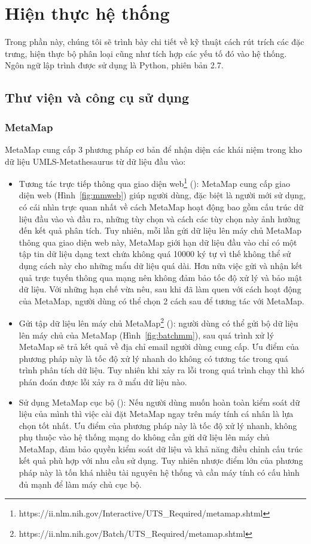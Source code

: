 \section{Hiện thực hệ thống} \label{sec:hienthuchethong}
Trong phần này, chúng tôi sẽ trình bày chi tiết về kỹ thuật cách rút trích các đặc trưng, hiện thực bộ phân loại cũng như tích hợp các yếu tố đó vào hệ thống. Ngôn ngữ lập trình được sử dụng là Python, phiên bản 2.7.

\subsection{Thư viện và công cụ sử dụng}
\subsubsection*{MetaMap}
MetaMap cung cấp 3 phương pháp cơ bản để nhận diện các khái niệm trong kho dữ liệu UMLS-Metathesaurus từ dữ liệu đầu vào:
\begin{itemize}
\item Tương tác trực tiếp thông qua giao diện web\footnote{https://ii.nlm.nih.gov/Interactive/UTS\_Required/metamap.shtml} (): MetaMap cung cấp giao diện web (Hình~\ref{fig:mmweb}) giúp người dùng, đặc biệt là người mới sử dụng, có cái nhìn trực quan nhất về cách MetaMap hoạt động bao gồm cấu trúc dữ liệu đầu vào và đầu ra, những tùy chọn và cách các tùy chọn này ảnh hưởng đến kết quả phân tích. Tuy nhiên, mỗi lần gửi dữ liệu lên máy chủ MetaMap thông qua giao diện web này, MetaMap giới hạn dữ liệu đầu vào chỉ có một tập tin dữ liệu dạng text chứa không quá 10000 ký tự vì thế không thể sử dụng cách này cho những mẩu dữ liệu quá dài. Hơn nữa việc gửi và nhận kết quả trực tuyến thông qua mạng nên không đảm bảo tốc độ xử lý và bảo mật dữ liệu. Với những hạn chế vừa nêu, sau khi đã làm quen với cách hoạt động của MetaMap, người dùng có thể chọn 2 cách sau để tương tác với MetaMap.
\item Gửi tập dữ liệu lên máy chủ MetaMap\footnote{https://ii.nlm.nih.gov/Batch/UTS\_Required/metamap.shtml} (): người dùng có thể gửi bộ dữ liệu lên máy chủ của MetaMap (Hình~\ref{fig:batchmm}), sau quá trình xử lý MetaMap sẽ trả kết quả về địa chỉ email người dùng cung cấp. Ưu điểm của phương pháp này là tốc độ xử lý nhanh do không có tương tác trong quá trình phân tích dữ liệu. Tuy nhiên khi xảy ra lỗi trong quá trình chạy thì khó phán đoán được lỗi xảy ra ở mẩu dữ liệu nào. 
\item Sử dụng MetaMap cục bộ (): Nếu người dùng muốn hoàn toàn kiểm soát dữ liệu của mình thì việc cài đặt MetaMap ngay trên máy tính cá nhân là lựa chọn tốt nhất. Ưu điểm của phương pháp này là tốc độ xử lý nhanh, không phụ thuộc vào hệ thống mạng do không cần gửi dữ liệu lên máy chủ MetaMap, đảm bảo quyền kiểm soát dữ liệu và khả năng điều chỉnh cấu trúc kết quả phù hợp với nhu cầu sử dụng. Tuy nhiên nhược điểm lớn của phương pháp này là tốn khá nhiều tài nguyên hệ thống và cần máy tính có cấu hình đủ mạnh để làm máy chủ cục bộ.
\end{itemize}

